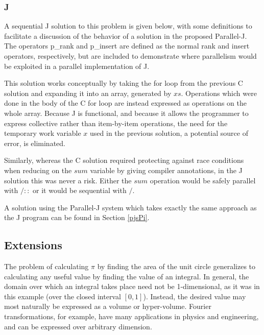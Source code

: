 \subsubsection{J}
A sequential J solution to this problem is given below, 
with some definitions to facilitate a discussion 
of the behavior of a solution in the proposed Parallel-J. 
The operators \ttfamily p\_rank \normalfont and \ttfamily p\_insert \normalfont 
are defined as the normal rank and insert operators, respectively,  
but are included to demonstrate where parallelism would be exploited in a parallel implementation of J.

\begin{singlespacing}
\begin{small}

\end{small}
\end{singlespacing}

This solution works conceptually by taking the for loop from the previous C solution 
and expanding it into an array, generated by $xs$.
Operations which were done in the body of the C for loop 
are instead expressed as operations on the whole array. 
Because J is functional, and 
because it allows the programmer to express collective rather than item-by-item operations, 
the need for the temporary work variable $x$ used in the previous solution, 
a potential source of error, is eliminated. 

Similarly, whereas the C solution required 
protecting against race conditions when reducing on the $sum$ variable
by giving compiler annotations, 
in the J solution this was never a risk.
Either the $sum$ operation would be safely parallel with $/::$ or 
it would be sequential with $/$.

A solution using the Parallel-J system which takes exactly the same approach as the J program 
can be found in Section \ref{pjsPi}.

\subsection{Extensions}
The problem of calculating $\pi$ by finding the area of the unit circle 
generalizes to calculating any useful value by finding the value of an integral. 
In general, the domain over which an integral takes place need not be 1-dimensional, 
as it was in this example (over the closed interval $[0,1]$).
Instead, the desired value may most naturally be expressed as a volume or hyper-volume. 
Fourier transformations, for example, have many applications in physics and engineering, 
and can be expressed over arbitrary dimension.


